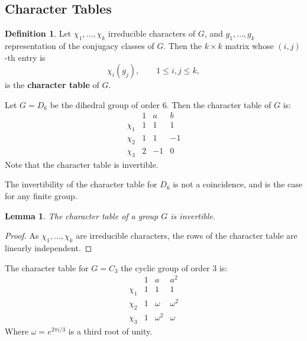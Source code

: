 \documentclass[11pt, notitlepage]{article}
\numberwithin{equation}{section}
\theoremstyle{plain}
\newtheorem{lemma}[theorem]{Lemma}
\theoremstyle{definition}
\newtheorem{definition}[theorem]{Definition}
\newenvironment{example}
	{\pushQED{\qed}\renewcommand{\qedsymbol}{$\blacktriangleleft$}\examplex}
	{\popQED\endexamplex}
\begin{document}
\subsection{Character Tables}


\begin{definition}
Let $\chi_1,\dots,\chi_k$ irreducible characters of $G$, and $g_1,\dots,g_k$ representation of the conjugacy classes of $G$. Then the $k \times k$ matrix whose $(i,j)$-th entry is
\[
    \chi_i(g_j), \qquad 1 \le i,j \le k,
\]
is the \textbf{character table} of $G$.
\end{definition}

\begin{example}
Let $G = D_6$ be the dihedral group of order 6. Then the character table of $G$ is:
\[
    \begin{array}{c|rrr}
               & 1 & a  & b \\\hline
        \chi_1 & 1 & 1  & 1 \\
        \chi_2 & 1 & 1  & -1\\
        \chi_3 & 2 & -1 & 0
    \end{array}
\]
Note that the character table is invertible.
\end{example}

The invertibility of the character table for $D_6$ is not a coincidence, and is the case for any finite group.

\begin{lemma}
The character table of a group $G$ is invertible.
\end{lemma}

\begin{proof}
As $\chi_1,\dots,\chi_k$ are irreducible characters, the rows of the character table are linearly independent.
\end{proof}

\begin{example}
The character table for $G = C_3$ the cyclic group of order 3 is:
\[
    \begin{array}{c|lll}
               & 1 & a        & a^2  \\\hline
        \chi_1 & 1 &    1     & 1 \\
        \chi_2 & 1 & \omega   & \omega^2\\
        \chi_3 & 1 & \omega^2 & \omega
    \end{array}
\]
Where $\omega = e^{2\pi i/3}$ is a third root of unity.
\end{example}
\end{document}
